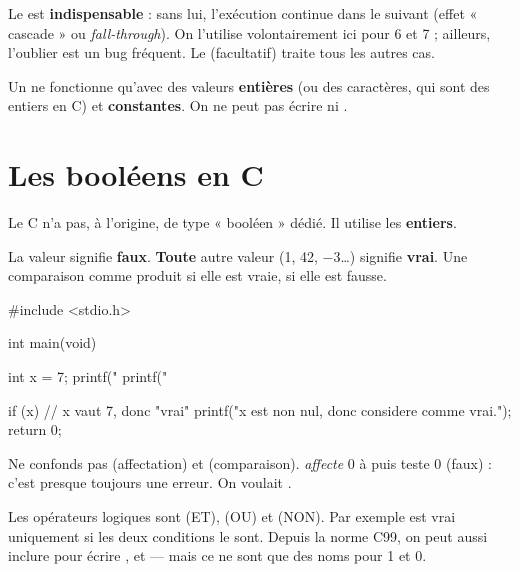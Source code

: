 
\begin{attention}
Le  est \textbf{indispensable} : sans lui, l'exécution continue dans le
 suivant (effet « cascade » ou \emph{fall-through}). On l'utilise
volontairement ici pour 6 et 7 ; ailleurs, l'oublier est un bug fréquent. Le
 (facultatif) traite tous les autres cas.
\end{attention}

\begin{remarque}
Un  ne fonctionne qu'avec des valeurs \textbf{entières} (ou des
caractères, qui sont des entiers en C) et \textbf{constantes}. On ne peut pas écrire
 ni .
\end{remarque}

\section{Les booléens en C}

Le C n'a pas, à l'origine, de type « booléen » dédié. Il utilise les \textbf{entiers}.

\begin{propriete}
La valeur  signifie \textbf{faux}. \textbf{Toute} autre valeur (1, 42, $-3$\dots)
signifie \textbf{vrai}. Une comparaison comme  produit  si elle
est vraie,  si elle est fausse.
\end{propriete}

\begin{codec}
#include <stdio.h>

int main(void) {
    int x = 7;
    printf("%
    printf("%

    if (x) {                 // x vaut 7, donc "vrai"
        printf("x est non nul, donc considere comme vrai.\n");
    }
    return 0;
}
\end{codec}

\begin{attention}
Ne confonds pas \code{=} (affectation) et \code{==} (comparaison). 
\emph{affecte} 0 à  puis teste 0 (faux) : c'est presque toujours une erreur.
On voulait .
\end{attention}

\begin{remarque}
Les opérateurs logiques sont \code{\&\&} (ET), \code{||} (OU) et \code{!} (NON). Par
exemple  est vrai uniquement si les deux conditions
le sont. Depuis la norme C99, on peut aussi inclure  pour écrire
,  et  — mais ce ne sont que des noms pour 1 et 0.
\end{remarque}

